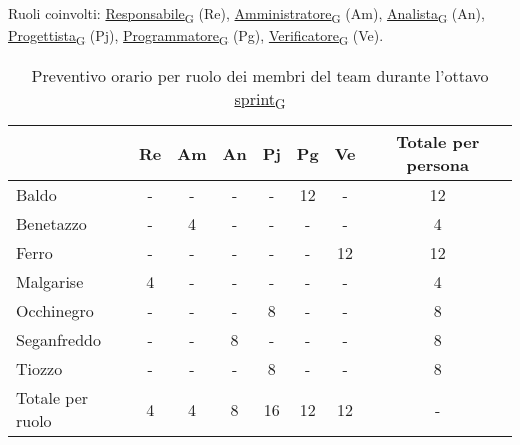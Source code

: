 \newpage
{}
Ruoli coinvolti: \href{https://7last.github.io/docs/pb/documentazione-interna/glossario\#responsabile}{Responsabile\textsubscript{G}} (Re), \href{https://7last.github.io/docs/pb/documentazione-interna/glossario\#amministratore}{Amministratore\textsubscript{G}} (Am), \href{https://7last.github.io/docs/pb/documentazione-interna/glossario\#analista}{Analista\textsubscript{G}} (An), \href{https://7last.github.io/docs/pb/documentazione-interna/glossario\#progettista}{Progettista\textsubscript{G}} (Pj), \href{https://7last.github.io/docs/pb/documentazione-interna/glossario\#programmatore}{Programmatore\textsubscript{G}} (Pg), \href{https://7last.github.io/docs/pb/documentazione-interna/glossario\#verificatore}{Verificatore\textsubscript{G}} (Ve).
\begin{table}[!h]
	\centering
	\begin{tabular}{ | l | c | c | c | c | c | c | c | }
		\hline
		\textbf{} & \textbf{Re} & \textbf{Am} &\textbf{An} & \textbf{Pj} & \textbf{Pg} & \textbf{Ve} & \textbf{Totale per persona} \\
		\hline			    %
		Baldo            &  -   &  -   &  -   &  -   & 12   &  -   & 12   \\
		Benetazzo        &  -   &  4   &  -   &  -   &  -   &  -   &  4   \\
		Ferro            &  -   &  -   &  -   &  -   &  -   & 12   & 12   \\
		Malgarise        &  4   &  -   &  -   &  -   &  -   &  -   &  4   \\
		Occhinegro       &  -   &  -   &  -   &  8   &  -   &  -   &  8   \\
		Seganfreddo      &  -   &  -   &  8   &  -   &  -   &  -   &  8   \\
		Tiozzo           &  -   &  -   &  -   &  8   &  -   &  -   &  8   \\
		\hline
		Totale per ruolo &  4   &  4   &  8   & 16   & 12   & 12   &  -   \\
		\hline
	\end{tabular}
	\caption{Preventivo orario per ruolo dei membri del team durante l'ottavo \href{https://7last.github.io/docs/pb/documentazione-interna/glossario\#sprint}{sprint\textsubscript{G}}}

\end{table}

